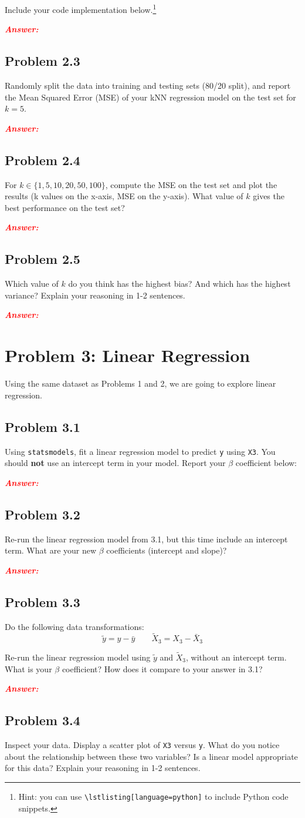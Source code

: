 \documentclass[11pt, letterpaper]{article}
\newcommand{\problem}[1]{\section*{Problem #1}}
\newcommand{\subproblem}[1]{\subsection*{Problem #1}}
\newcommand{\answer}{\textbf{\textit{\textcolor{red}{Answer:}}}\\}
\begin{document}
Include your code implementation below.\footnote{
    Hint: you can use \texttt{\textbackslash lstlisting[language=python]} to include Python code snippets.
}

\answer

\subproblem{2.3}

Randomly split the data into training and testing sets (80/20 split), and
report the Mean Squared Error (MSE) of your kNN regression model on the test set for $k=5$.

\answer

\subproblem{2.4}

For $k \in \{1, 5, 10, 20, 50, 100 \}$, compute the MSE on the test set and plot the results (k values on the x-axis, MSE on the y-axis).
What value of $k$ gives the best performance on the test set?

\answer


\subproblem{2.5}

Which value of $k$ do you think has the highest bias? And which has the highest variance? Explain your reasoning in 1-2 sentences.

\answer

\problem{3: Linear Regression}

Using the same dataset as Problems 1 and 2, we are going to explore linear regression.

\subproblem{3.1}

Using \texttt{statsmodels}, fit a linear regression model to predict \texttt{y} using \texttt{X3}.
You should \textbf{not} use an intercept term in your model. Report your
$\beta$ coefficient below:

\answer

\subproblem{3.2}

Re-run the linear regression model from 3.1, but this time include an intercept term.
What are your new $\beta$ coefficients (intercept and slope)?

\answer

\subproblem{3.3}

Do the following data transformations:
$$\tilde{y} = y - \bar{y} \quad \quad \tilde{X}_3 = X_3 - \bar{X}_3$$

Re-run the linear regression model using $\tilde{y}$ and $\tilde{X}_3$, without an intercept term.
What is your $\beta$ coefficient? How does it compare to your answer in 3.1?

\answer

\subproblem{3.4}

Inspect your data. Display a scatter plot of \texttt{X3} versus \texttt{y}. What do you notice about the relationship between these two variables?
Is a linear model appropriate for this data? Explain your reasoning in 1-2 sentences.
\end{document}
